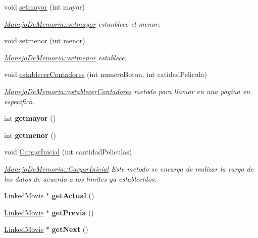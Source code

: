 \begin{DoxyCompactItemize}
void \hyperlink{classManejoDeMemoria_a867d2a0b738d0a3c1635517166928ec8}{setmayor} (int mayor)
\begin{DoxyCompactList}\small\item\em \hyperlink{classManejoDeMemoria_a867d2a0b738d0a3c1635517166928ec8}{Manejo\+De\+Memoria\+::setmayor} estanblece el menor. \end{DoxyCompactList}\item 
void \hyperlink{classManejoDeMemoria_a381338b7926d5cb1feef9f7ed6408e33}{setmenor} (int menor)
\begin{DoxyCompactList}\small\item\em \hyperlink{classManejoDeMemoria_a381338b7926d5cb1feef9f7ed6408e33}{Manejo\+De\+Memoria\+::setmenor} establece. \end{DoxyCompactList}\item 
void \hyperlink{classManejoDeMemoria_a2d4239a7776d1588548a39dc1b1a7807}{establecer\+Contadores} (int numero\+Boton, int catidad\+Pelicula)
\begin{DoxyCompactList}\small\item\em \hyperlink{classManejoDeMemoria_a2d4239a7776d1588548a39dc1b1a7807}{Manejo\+De\+Memoria\+::establecer\+Contadores} metodo para llamar en una pagina en especifico. \end{DoxyCompactList}\item 
\mbox{\label{classManejoDeMemoria_aaef95674df640702069accb6001d58e4}} 
int {\bfseries getmayor} ()
\item 
\mbox{\label{classManejoDeMemoria_a20c70a240e0625bead68f284c74ba35e}} 
int {\bfseries getmenor} ()
\item 
void \hyperlink{classManejoDeMemoria_af055a25f1736ffbd7c73a7746f6b378d}{Cargar\+Inicial} (int cantidad\+Peliculas)
\begin{DoxyCompactList}\small\item\em \hyperlink{classManejoDeMemoria_af055a25f1736ffbd7c73a7746f6b378d}{Manejo\+De\+Memoria\+::\+Cargar\+Inicial} Este metodo se encarga de realizar la carga de los datos de acuerdo a los limites ya establecidos. \end{DoxyCompactList}\item 
\mbox{\label{classManejoDeMemoria_aa7d9e8ed1d7425c9382a912e361fd055}} 
\hyperlink{classLinkedMovie}{Linked\+Movie} $\ast$ {\bfseries get\+Actual} ()
\item 
\mbox{\label{classManejoDeMemoria_a0392ea5f0d2d2ca96af532f87e0384dd}} 
\hyperlink{classLinkedMovie}{Linked\+Movie} $\ast$ {\bfseries get\+Previa} ()
\item 
\mbox{\label{classManejoDeMemoria_a2a5066e7e82436e534a5e4915e75e2b8}} 
\hyperlink{classLinkedMovie}{Linked\+Movie} $\ast$ {\bfseries get\+Next} ()
\end{DoxyCompactItemize}


